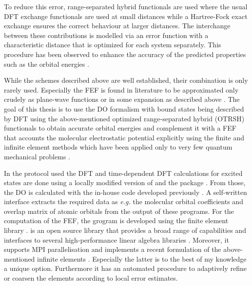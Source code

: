 To reduce this error, range-separated hybrid functionals are used where the usual DFT exchange functionals are used at small distances while a Hartree-Fock exact exchange ensures the correct behaviour at larger distances.
The interchange between these contributions is modelled via an error function with a characteristic distance that is optimized for each system separately.
This procedure has been observed to enhance the accuracy of the predicted properties such as the orbital energies \cite{Bokareva,GrellKuehn, Gerber, Gerber2}.

While the schemes described above are well established, their combination is only rarely used.
Especially the FEF is found in literature to be approximated only crudely as plane-wave functions \cite{planeWave} or in some expansion as described above \cite{ezDyson,MAgg,GrellKuehn}.
The goal of this thesis is to use the DO formalism with bound states being described by DFT using the above-mentioned optimized range-separated hybrid (OTRSH) functionals to obtain accurate orbital energies and complement it with a FEF that accounts the molecular electrostatic potential explicitly using the finite and infinite element methods which have been applied only to very few quantum mechanical problems \cite{sobaMolecule,bettessHarmonic}.

In the protocol used the DFT and time-dependent DFT calculations for excited states are done using a locally modified version of  \cite{nwchem} and the  package \cite{g09}.
From those, the DO is calculated with the in-house code  developed previously \cite{MAgg}.
A self-written interface extracts the required data as \textit{e.g.} the molecular orbital coefficients and overlap matrix of atomic orbitals from the output of these programs.
For the computation of the FEF, the grogram  \cite{FreeWilly} is developed using the finite element library  \cite{libmesh}. 
 is an open source library that provides a broad range of capabilities and interfaces to several high-performance linear algebra libraries \cite{slepc1,slepc2,petsc}.
Moreover, it supports MPI parallelisation and implements a recent formulation of the above-mentioned infinite elements \cite{dreyer}.
Especially the latter is to the best of my knowledge a unique option.
Furthermore it has an automated procedure to adaptively refine or coarsen the elements according to local error estimates.

